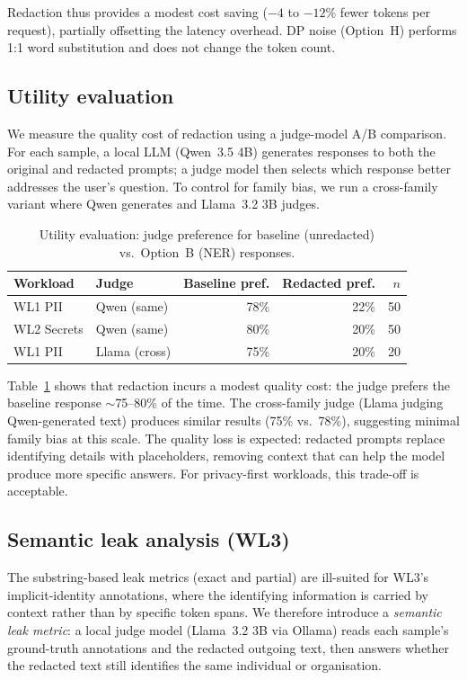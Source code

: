 \documentclass[11pt,a4paper]{article}
\begin{document}
Redaction thus provides a modest cost saving ($-4$ to $-12$\%
fewer tokens per request), partially offsetting the latency
overhead.  DP noise (Option~H) performs 1:1 word substitution
and does not change the token count.

\subsection{Utility evaluation}

We measure the quality cost of redaction using a judge-model
A/B comparison.  For each sample, a local LLM (Qwen~3.5 4B)
generates responses to both the original and redacted prompts;
a judge model then selects which response better addresses the
user's question.  To control for family bias, we run a
cross-family variant where Qwen generates and Llama~3.2 3B
judges.

\begin{table}[h]
\centering
\small
\caption{Utility evaluation: judge preference for baseline
  (unredacted) vs.\ Option~B (NER) responses.}
\label{tab:utility}
\begin{tabular}{llrrr}
\toprule
Workload & Judge & Baseline pref. & Redacted pref. & $n$ \\
\midrule
WL1 PII     & Qwen (same)  & 78\% & 22\% & 50 \\
WL2 Secrets & Qwen (same)  & 80\% & 20\% & 50 \\
WL1 PII     & Llama (cross) & 75\% & 20\% & 20 \\
\bottomrule
\end{tabular}
\end{table}

Table~\ref{tab:utility} shows that redaction incurs a modest
quality cost: the judge prefers the baseline response
$\sim$75--80\% of the time.  The cross-family judge (Llama
judging Qwen-generated text) produces similar results (75\%
vs.\ 78\%), suggesting minimal family bias at this scale.
The quality loss is expected: redacted prompts replace
identifying details with placeholders, removing context that
can help the model produce more specific answers.  For
privacy-first workloads, this trade-off is acceptable.

\subsection{Semantic leak analysis (WL3)}

The substring-based leak metrics (exact and partial) are
ill-suited for WL3's implicit-identity annotations, where
the identifying information is carried by context rather than
by specific token spans.  We therefore introduce a
\emph{semantic leak metric}: a local judge model (Llama~3.2 3B
via Ollama) reads each sample's ground-truth annotations and
the redacted outgoing text, then answers whether the redacted
text still identifies the same individual or organisation.
\end{document}
